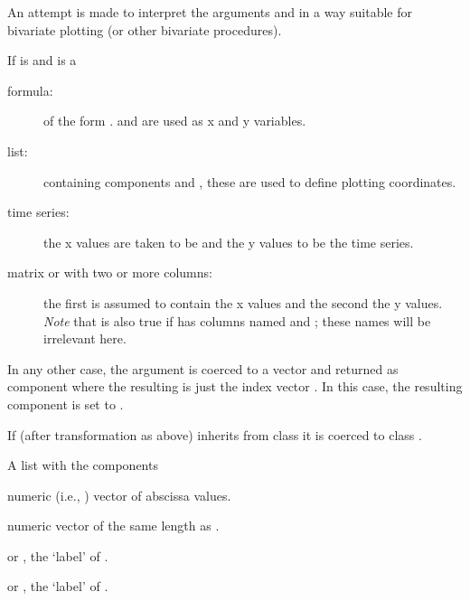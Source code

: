 \begin{Details}\relax
An attempt is made to interpret the arguments  and  in
a way suitable for bivariate plotting (or other bivariate procedures).

If  is  and  is a
\begin{description}

\item[formula:] of the form .  and
 are used as x and y variables.

\item[list:] containing components  and , these are
used to define plotting coordinates.

\item[time series:] the x values are taken to be
 and the y values to be the time series.

\item[matrix or  with two or more
columns:] the first is assumed to contain the x values and the
second the y values.  \emph{Note} that is also true if 
has columns named  and ; these names will be
irrelevant here.

\end{description}

In any other case, the  argument is coerced to a vector and
returned as  component where the resulting  is just
the index vector .  In this case, the resulting 
component is set to .

If  (after transformation as above) inherits from class
 it is coerced to class .
\end{Details}
%
\begin{Value}
A list with the components
\begin{ldescription}
\item[\code{x}] numeric (i.e., ) vector of abscissa values.
\item[\code{y}] numeric vector of the same length as .
\item[\code{xlab}]  or , the `label' of
.
\item[\code{ylab}]  or , the `label' of
.
\end{ldescription}
\end{Value}
